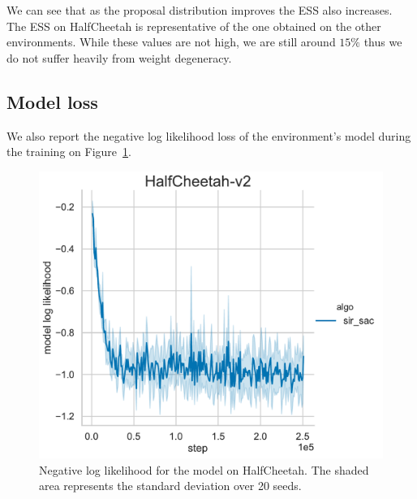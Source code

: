 We can see that as the proposal distribution improves the ESS also increases. The ESS on HalfCheetah is representative of the one obtained on the other environments. 
While these values are not high, we are still around $15 \%$ thus we do not suffer heavily from weight degeneracy. 


\subsection{Model loss}
\label{app:model_loss}
We also report the negative log likelihood loss of the environment's model during the training on Figure~\ref{fig:neg_log_lik}.


\begin{figure}[!h]
\centering
\includegraphics[width=0.5\linewidth]{articles/smcp/figures/HalfCheetah-v2_loglik1543284334.pdf}
\caption{Negative log likelihood for the model on HalfCheetah. The shaded area represents the standard deviation over 20 seeds.}
\label{fig:neg_log_lik}
\end{figure}
